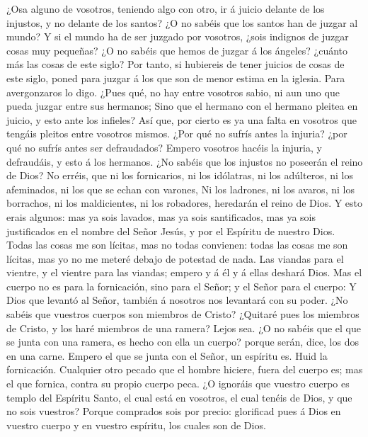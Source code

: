  ¿Osa alguno de vosotros, teniendo algo con otro, ir á
juicio delante de los injustos, y no delante de los santos?
 ¿O no sabéis que los santos han de juzgar al mundo? Y si
el mundo ha de ser juzgado por vosotros, ¿sois indignos de juzgar cosas
muy pequeñas?  ¿O no sabéis que hemos de juzgar á los
ángeles? ¿cuánto más las cosas de este siglo?  Por tanto,
si hubiereis de tener juicios de cosas de este siglo, poned para juzgar
á los que son de menor estima en la iglesia.  Para
avergonzaros lo digo. ¿Pues qué, no hay entre vosotros sabio, ni aun uno
que pueda juzgar entre sus hermanos;  Sino que el hermano
con el hermano pleitea en juicio, y esto ante los infieles?
 Así que, por cierto es ya una falta en vosotros que
tengáis pleitos entre vosotros mismos. ¿Por qué no sufrís antes la
injuria? ¿por qué no sufrís antes ser defraudados?  Empero
vosotros hacéis la injuria, y defraudáis, y esto á los hermanos.
 ¿No sabéis que los injustos no poseerán el reino de Dios?
No erréis, que ni los fornicarios, ni los idólatras, ni los adúlteros,
ni los afeminados, ni los que se echan con varones,  Ni
los ladrones, ni los avaros, ni los borrachos, ni los maldicientes, ni
los robadores, heredarán el reino de Dios.  Y esto erais
algunos: mas ya sois lavados, mas ya sois santificados, mas ya sois
justificados en el nombre del Señor Jesús, y por el Espíritu de nuestro
Dios.  Todas las cosas me son lícitas, mas no todas
convienen: todas las cosas me son lícitas, mas yo no me meteré debajo de
potestad de nada.  Las viandas para el vientre, y el
vientre para las viandas; empero y á él y á ellas deshará Dios. Mas el
cuerpo no es para la fornicación, sino para el Señor; y el Señor para el
cuerpo:  Y Dios que levantó al Señor, también á nosotros
nos levantará con su poder.  ¿No sabéis que vuestros
cuerpos son miembros de Cristo? ¿Quitaré pues los miembros de Cristo, y
los haré miembros de una ramera? Lejos sea.  ¿O no sabéis
que el que se junta con una ramera, es hecho con ella un cuerpo? porque
serán, dice, los dos en una carne.  Empero el que se
junta con el Señor, un espíritu es.  Huid la fornicación.
Cualquier otro pecado que el hombre hiciere, fuera del cuerpo es; mas el
que fornica, contra su propio cuerpo peca.  ¿O ignoráis
que vuestro cuerpo es templo del Espíritu Santo, el cual está en
vosotros, el cual tenéis de Dios, y que no sois vuestros?
 Porque comprados sois por precio: glorificad pues á Dios
en vuestro cuerpo y en vuestro espíritu, los cuales son de Dios.

